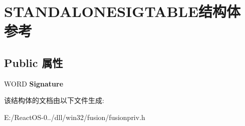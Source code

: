 \hypertarget{struct_s_t_a_n_d_a_l_o_n_e_s_i_g_t_a_b_l_e}{}\section{S\+T\+A\+N\+D\+A\+L\+O\+N\+E\+S\+I\+G\+T\+A\+B\+L\+E结构体 参考}
\label{struct_s_t_a_n_d_a_l_o_n_e_s_i_g_t_a_b_l_e}
\subsection*{Public 属性}
\begin{DoxyCompactItemize}
\item 
\mbox{\label{struct_s_t_a_n_d_a_l_o_n_e_s_i_g_t_a_b_l_e_af5c3f2f8bb4bb3de198fec978f228bb5}} 
W\+O\+RD {\bfseries Signature}
\end{DoxyCompactItemize}


该结构体的文档由以下文件生成\+:\begin{DoxyCompactItemize}
\item 
E\+:/\+React\+O\+S-\/0../dll/win32/fusion/fusionpriv.\+h\end{DoxyCompactItemize}
